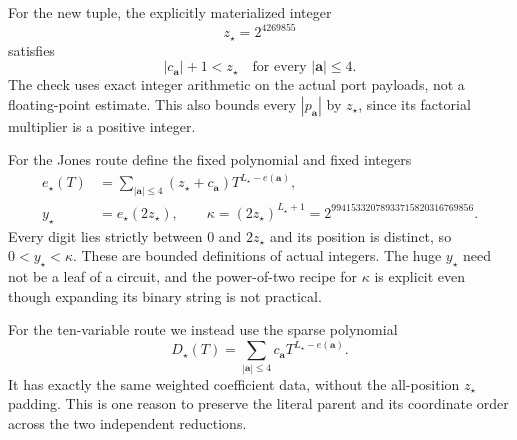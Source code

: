 For the new tuple, the explicitly materialized integer
\[
 z_\star=2^{4269855}
\]
satisfies
\begin{equation}\label{eq:coefficient-bound}
 |c_{\boldsymbol a}|+1<z_\star
 \quad\text{for every }|\boldsymbol a|\le4.
\end{equation}
The check uses exact integer arithmetic on the actual port payloads,
not a floating-point estimate.  This also bounds every
$|p_{\boldsymbol a}|$ by $z_\star$, since its factorial multiplier is a
positive integer.

For the Jones route define the fixed polynomial and fixed integers
\begin{align*}
 e_\star(T)&=\sum_{|\boldsymbol a|\le4}
                  (z_\star+c_{\boldsymbol a})T^{L_\star-e(\boldsymbol a)},\\
 y_\star&=e_\star(2z_\star),\qquad
 \kappa=(2z_\star)^{L_\star+1}
        =2^{99415332078933715820316769856}.
\end{align*}
Every digit lies strictly between 0 and $2z_\star$ and its position is
distinct, so $0<y_\star<\kappa$.  These are bounded definitions of actual
integers.  The huge $y_\star$ need not be a leaf of a circuit, and the
power-of-two recipe for $\kappa$ is explicit even though expanding its
binary string is not practical.

For the ten-variable route we instead use the sparse polynomial
\[
 D_\star(T)=\sum_{|\boldsymbol a|\le4}
                   c_{\boldsymbol a}T^{L_\star-e(\boldsymbol a)}.
\]
It has exactly the same weighted coefficient data, without the all-position
$z_\star$ padding.  This is one reason to preserve the literal parent and
its coordinate order across the two independent reductions.
